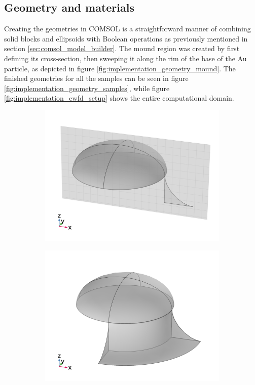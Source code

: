 \subsection{Geometry and materials}
Creating the geometries in COMSOL is a straightforward manner of combining solid blocks and ellipsoids with Boolean operations as previously mentioned in section \ref{sec:comsol_model_builder}. The mound region was created by first defining its cross-section, then sweeping it along the rim of the base of the Au particle, as depicted in figure \ref{fig:implementation_geometry_mound}. The finished geometries for all the samples can be seen in figure \ref{fig:implementation_geometry_samples}, while figure \ref{fig:implementation_ewfd_setup} shows the entire computational domain.
\begin{figure}[htb!]
    \begin{subfigure}{0.3\textwidth}
        \centering
        \includegraphics[width=0.8\linewidth, trim=0cm 0 0 0cm, clip]{figures/ch4/implem/geometry/Sample5A_mound_workplane.png}
    \end{subfigure}
    \begin{subfigure}{0.3\textwidth}
        \centering
        \includegraphics[width=0.8\linewidth, trim=0cm 0 0 0cm, clip]{figures/ch4/implem/geometry/Sample5A_mound_sweep.png}

\end{subfigure}
\end{figure}
